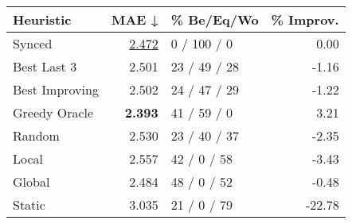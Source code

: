 \begin{tabular}{lrlr}
\toprule
\textbf{Heuristic} & \textbf{MAE ↓} & \textbf{\% Be/Eq/Wo} & \textbf{\% Improv.} \\
\midrule
            Synced &          \underline{2.472} &          0 / 100 / 0 &                0.00 \\
\midrule
       Best Last 3 &          2.501 &         23 / 49 / 28 &               -1.16 \\
    Best Improving &          2.502 &         24 / 47 / 29 &               -1.22 \\
\addlinespace
     Greedy Oracle &          \textbf{2.393} &          41 / 59 / 0 &                3.21 \\
            Random &          2.530 &         23 / 40 / 37 &               -2.35 \\
\midrule
             Local &          2.557 &          42 / 0 / 58 &               -3.43 \\
            Global &          2.484 &          48 / 0 / 52 &               -0.48 \\
\midrule
            Static &          3.035 &          21 / 0 / 79 &              -22.78 \\
\bottomrule
\end{tabular}

\label{tab:hr_iid_lr05_le1_bs2_Summary}
